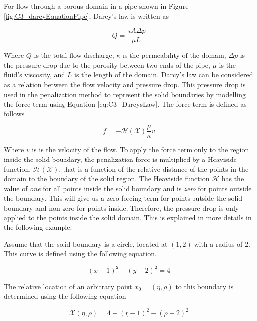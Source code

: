 For flow through a porous domain in a pipe shown in Figure \ref{fig:C3_darcyEquationPipe}, Darcy's law is written as

\begin{equation}\label{eq:C3_DarcysLaw}
    Q = \frac{\kappa A \Delta p}{\mu L}
\end{equation}

Where $Q$ is the total flow discharge, $\kappa$ is the permeability of the domain, $\Delta p$ is the pressure drop due to the porosity between two ends of the pipe, $\mu$ is the fluid's viscosity, and $L$ is the length of the domain. Darcy's law can be considered as a relation between the flow velocity and pressure drop. This pressure drop is used in the penalization method to represent the solid boundaries by modelling the force term using Equation \eqref{eq:C3_DarcysLaw}. The force term is defined as follows

\begin{equation}\label{eq:C3_forceTermIBpenelization}
    f = - \mathcal{H}(\mathcal{X}) \frac{\mu}{\kappa} v
\end{equation}

Where $v$ is is the velocity of the flow. To apply the force term only to the region inside the solid boundary, the penalization force is multiplied by a Heaviside function, $\mathcal{H}(\mathcal{X})$, that is a function of the relative distance of the points in the domain to the boundary of the solid region. The Heaviside function $\mathcal{H}$ has the value of \emph{one} for all points inside the solid boundary and is \emph{zero} for points outside the boundary. This will give us a zero forcing term for points outside the solid boundary and non-zero for points inside. Therefore, the pressure drop is only applied to the points inside the solid domain. This is explained in more details in the following example.

Assume that the solid boundary is a circle, located at $(1,2)$ with a radius of $2$. This curve is defined using the following equation.

\begin{equation}
    (x - 1)^2 + (y - 2)^2 = 4
\end{equation}

The relative location of an arbitrary point $x_0 = (\eta, \rho)$ to this boundary is determined using the following equation

\begin{equation}
    \mathcal{X}(\eta, \rho) = 4 - (\eta - 1)^2 - (\rho - 2)^2
\end{equation}

